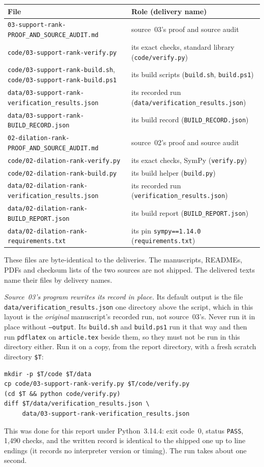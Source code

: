 \documentclass[11pt,letterpaper]{article}
\numberwithin{equation}{section}
\theoremstyle{definition}
\theoremstyle{remark}
\newcommand{\rpath}[1]{\nolinkurl{#1}}%
\begin{document}
\begin{center}\small
\begin{tabularx}{\textwidth}{@{}P{0.47\textwidth}Y@{}}
\toprule
File & Role (delivery name)\\
\midrule
\rpath{03-support-rank-PROOF_AND_SOURCE_AUDIT.md} & source~03's proof and source audit\\
\rpath{code/03-support-rank-verify.py} & its exact checks, standard library (\texttt{code/verify.py})\\
\rpath{code/03-support-rank-build.sh}, \rpath{code/03-support-rank-build.ps1} & its build scripts (\texttt{build.sh}, \texttt{build.ps1})\\
\rpath{data/03-support-rank-verification_results.json} & its recorded run (\texttt{data/verification\_results.json})\\
\rpath{data/03-support-rank-BUILD_RECORD.json} & its build record (\texttt{BUILD\_RECORD.json})\\
\rpath{02-dilation-rank-PROOF_AND_SOURCE_AUDIT.md} & source~02's proof and source audit\\
\rpath{code/02-dilation-rank-verify.py} & its exact checks, SymPy (\texttt{verify.py})\\
\rpath{code/02-dilation-rank-build.py} & its build helper (\texttt{build.py})\\
\rpath{data/02-dilation-rank-verification_results.json} & its recorded run (\texttt{verification\_results.json})\\
\rpath{data/02-dilation-rank-BUILD_REPORT.json} & its build report (\texttt{BUILD\_REPORT.json})\\
\rpath{data/02-dilation-rank-requirements.txt} & its pin \texttt{sympy==1.14.0} (\texttt{requirements.txt})\\
\bottomrule
\end{tabularx}
\end{center}
These files are byte-identical to the deliveries. The manuscripts, READMEs,
PDFs and checksum lists of the two sources are not shipped. The delivered
texts name their files by delivery names.

\emph{Source~03's program rewrites its record in place.} Its default output
is the file \rpath{data/verification_results.json} one directory above the
script, which in this layout is the \emph{original} manuscript's recorded run,
not source~03's. Never run it in place without \texttt{--output}. Its
\texttt{build.sh} and \texttt{build.ps1} run it that way and then run
\texttt{pdflatex} on \texttt{article.tex} beside them, so they must not be run
in this directory either. Run it on a copy, from the report directory, with a
fresh scratch directory \texttt{\$T}:
\begin{verbatim}
mkdir -p $T/code $T/data
cp code/03-support-rank-verify.py $T/code/verify.py
(cd $T && python code/verify.py)
diff $T/data/verification_results.json \
     data/03-support-rank-verification_results.json
\end{verbatim}
This was done for this report under Python~3.14.4: exit code~0, status
\texttt{PASS}, 1,490 checks, and the written record is identical to the
shipped one up to line endings (it records no interpreter version or timing).
The run takes about one second.
\end{document}
